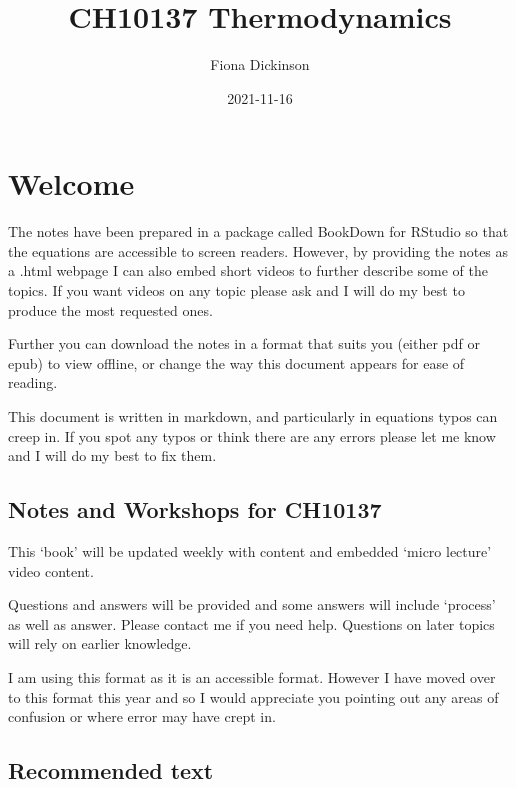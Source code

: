 \documentclass[
]{book}
\title{CH10137 Thermodynamics}
\author{Fiona Dickinson}
\date{2021-11-16}
\begin{document}
\maketitle

{
\setcounter{tocdepth}{1}
\tableofcontents
}
\hypertarget{welcome}{%
\chapter*{Welcome}\label{welcome}}

The notes have been prepared in a package called BookDown for RStudio so that the equations are accessible to screen readers. However, by providing the notes as a .html webpage I can also embed short videos to further describe some of the topics. If you want videos on any topic please ask and I will do my best to produce the most requested ones.

Further you can download the notes in a format that suits you (either pdf or epub) to view offline, or change the way this document appears for ease of reading.

This document is written in markdown, and particularly in equations typos can creep in. If you spot any typos or think there are any errors please let me know and I will do my best to fix them.

\hypertarget{notes-and-workshops-for-ch10137}{%
\section*{Notes and Workshops for CH10137}\label{notes-and-workshops-for-ch10137}}

This `book' will be updated weekly with content and embedded `micro lecture' video content.

Questions and answers will be provided and some answers will include `process' as well as answer. Please contact me if you need help. Questions on later topics will rely on earlier knowledge.

I am using this format as it is an accessible format. However I have moved over to this format this year and so I would appreciate you pointing out any areas of confusion or where error may have crept in.

\hypertarget{recommended-text}{%
\section*{Recommended text}\label{recommended-text}}
\end{document}

